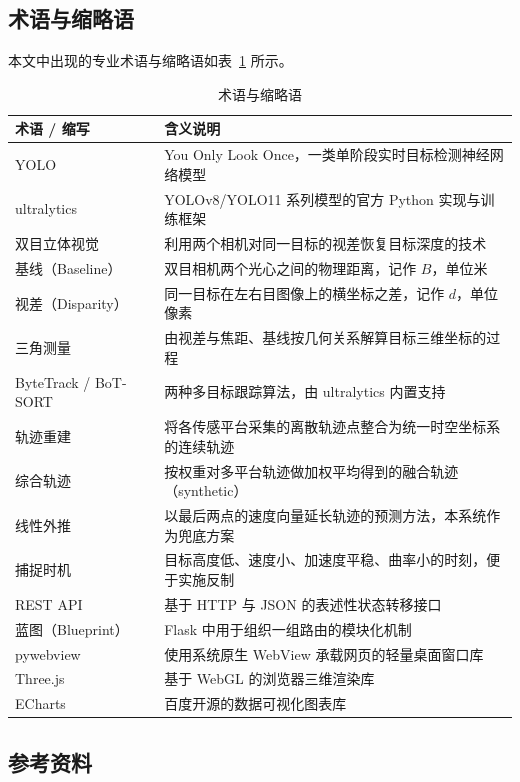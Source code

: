 \subsection{术语与缩略语}

本文中出现的专业术语与缩略语如表~\ref{tab:terms} 所示。

\begin{table}[H]
\centering
\caption{术语与缩略语}
\label{tab:terms}
\small
\begin{tabularx}{\linewidth}{@{}>{\heiti}p{3.4cm}X@{}}
\toprule
术语 / 缩写 & 含义说明 \\
\midrule
YOLO & You Only Look Once，一类单阶段实时目标检测神经网络模型 \\
ultralytics & YOLOv8/YOLO11 系列模型的官方 Python 实现与训练框架 \\
双目立体视觉 & 利用两个相机对同一目标的视差恢复目标深度的技术 \\
基线（Baseline） & 双目相机两个光心之间的物理距离，记作 $B$，单位米 \\
视差（Disparity） & 同一目标在左右目图像上的横坐标之差，记作 $d$，单位像素 \\
三角测量 & 由视差与焦距、基线按几何关系解算目标三维坐标的过程 \\
ByteTrack / BoT-SORT & 两种多目标跟踪算法，由 ultralytics 内置支持 \\
轨迹重建 & 将各传感平台采集的离散轨迹点整合为统一时空坐标系的连续轨迹 \\
综合轨迹 & 按权重对多平台轨迹做加权平均得到的融合轨迹（synthetic） \\
线性外推 & 以最后两点的速度向量延长轨迹的预测方法，本系统作为兜底方案 \\
捕捉时机 & 目标高度低、速度小、加速度平稳、曲率小的时刻，便于实施反制 \\
REST API & 基于 HTTP 与 JSON 的表述性状态转移接口 \\
蓝图（Blueprint） & Flask 中用于组织一组路由的模块化机制 \\
pywebview & 使用系统原生 WebView 承载网页的轻量桌面窗口库 \\
Three.js & 基于 WebGL 的浏览器三维渲染库 \\
ECharts & 百度开源的数据可视化图表库 \\
\bottomrule
\end{tabularx}
\end{table}

\subsection{参考资料}

